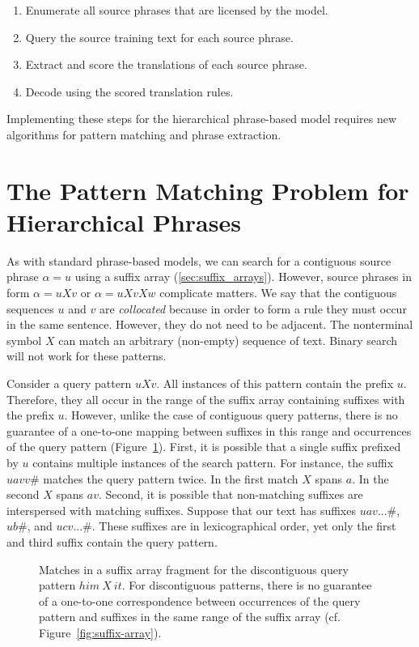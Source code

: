 \begin{enumerate}
	\item Enumerate all source phrases that are licensed by the model.
	\item Query the source training text for each source phrase.
	\item Extract and score the translations of each source phrase.
	\item Decode using the scored translation rules.
\end{enumerate}

\noindent Implementing these steps for the hierarchical phrase-based
model requires new algorithms for pattern matching and phrase extraction.

\section{The Pattern Matching Problem for Hierarchical Phrases}\label{sec:problem}

As with standard phrase-based models, we can search for a contiguous source
phrase $\alpha=u$ using a suffix array (\textsection\ref{sec:suffix_arrays}).
However, source phrases in form $\alpha=uXv$ or $\alpha=uXvXw$ complicate matters.
We say that the contiguous sequences $u$ and $v$ are {\em collocated}
because in order to form a rule they must occur in the same sentence.  
However, they do not need to be adjacent.
The nonterminal symbol $X$ can match an arbitrary (non-empty) sequence 
of text.  Binary search will not work for these patterns.  

Consider a query pattern $uXv$.
All instances of this pattern contain the prefix $u$.
Therefore, they all occur in the range of the suffix array containing 
suffixes with the prefix $u$.  However, unlike the case of contiguous
query patterns, there is no guarantee of a one-to-one mapping between
suffixes in this range and occurrences of the query pattern
(Figure~\ref{fig:discontig-sa}).
First, it is possible that a single suffix prefixed by $u$
contains multiple instances of the search pattern.  For instance, the 
suffix $uavv\#$ matches the query pattern twice.  In the first match $X$ spans
$a$.  In the second $X$ spans $av$.  Second, it is possible that
non-matching suffixes are interspersed with matching suffixes.  Suppose that
our text has suffixes $uav...\#$, $ub\#$, and $ucv...\#$.  These suffixes are in
lexicographical order, yet only the first and third suffix contain the
query pattern.

\figpreamble
\begin{figure}
	\figfontsize{
	\begin{center}
		
	\end{center}}
	\figpostamble
	\caption[Matches in a suffix array fragment for the discontiguous query pattern $him~X~it$.]{Matches in a suffix array fragment for the
	discontiguous query pattern $him~X~it$.  For discontiguous patterns,
	there  is no guarantee of a
	one-to-one correspondence between occurrences of the
	query pattern and suffixes in the same range of the suffix array
	(cf. Figure~\ref{fig:suffix-array}).}\label{fig:discontig-sa}
\end{figure}

